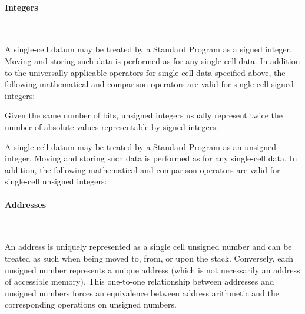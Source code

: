 \begin{quote}\ttfamily
				
\end{quote}


\paragraph{Integers} ~ %

A single-cell datum may be treated by a Standard Program as a signed
integer. Moving and storing such data is performed as for any
single-cell data. In addition to the universally-applicable operators
for single-cell data specified above, the following mathematical and
comparison operators are valid for single-cell signed integers:

\begin{quote}\ttfamily
	\word{*}	\word{*/}		
		\word{+}	\word{+!}		\word{-}
	\word{/}				
				
			
\end{quote}

Given the same number of bits, unsigned integers usually represent
twice the number of absolute values representable by signed integers.

A single-cell datum may be treated by a Standard Program as an
unsigned integer. Moving and storing such data is performed as for
any single-cell data. In addition, the following mathematical and
comparison operators are valid for single-cell unsigned integers:

\begin{quote}\ttfamily
			\word{+}	\word{+!}
	\word{-}				\word{*}
		
\end{quote}


\paragraph{Addresses} ~ %

An address is uniquely represented as a single cell unsigned number
and can be treated as such when being moved to, from, or upon the
stack. Conversely, each unsigned number represents a unique address
(which is not necessarily an address of accessible memory). This
one-to-one relationship between addresses and unsigned numbers forces
an equivalence between address arithmetic and the corresponding
operations on unsigned numbers.

